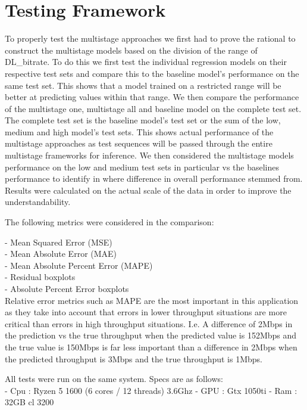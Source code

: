 \section{Testing Framework}
To properly test the multistage approaches we first had to prove the rational to construct the multistage models based on the division of the range of DL\_bitrate. To do this we first test the individual regression models on their respective test sets and compare this to the baseline model's performance on the same test set. This shows that a model trained on a restricted range will be better at predicting values within that range. We then compare the performance of the multistage one, multistage all and baseline model on the complete test set. The complete test set is the baseline model's test set or the sum of the low, medium and high model's test sets. This shows actual performance of the multistage approaches as test sequences will be passed through the entire multistage frameworks for inference. We then considered the multistage models performance on the low and medium test sets in particular vs the baselines performance to identify in where difference in overall performance stemmed from. Results were calculated on the actual scale of the data in order to improve the understandability.

The following metrics were considered in the comparison:

- Mean Squared Error (MSE)\\
- Mean Absolute Error (MAE)\\
- Mean Absolute Percent Error (MAPE)\\
- Residual boxplots \\ 
- Absolute Percent Error boxplots \\

Relative error metrics such as MAPE are the most important in this application as they take into account that errors in lower throughput situations are more critical than errors in high throughput situations. I.e. A difference of 2Mbps in the prediction vs the true throughput when the predicted value is 152Mbps and the true value is 150Mbps is far less important than a difference in 2Mbps when the predicted throughput is 3Mbps and the true throughput is 1Mbps.

All tests were run on the same system. Specs are as follows: \\

- Cpu : Ryzen 5 1600 (6 cores / 12 threads) \@ 3.6Ghz
- GPU : Gtx 1050ti
- Ram : 32GB cl 3200 